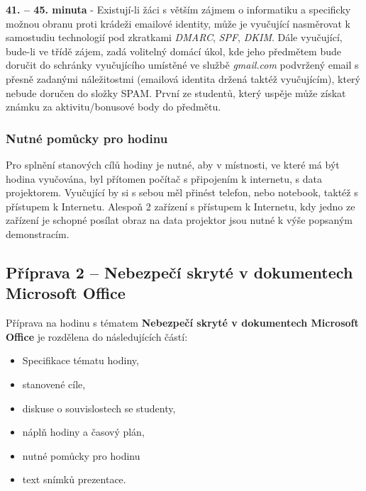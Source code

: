 \documentclass[a4paper, 12pt]{article}
\begin{document}
\textbf{41. -- 45. minuta} - Existují-li žáci s větším zájmem o informatiku a specificky možnou obranu proti krádeži emailové identity, může je vyučující nasměrovat k samostudiu technologií pod zkratkami \textit{DMARC}, \textit{SPF}, \textit{DKIM}. Dále vyučující, bude-li ve třídě zájem, zadá volitelný domácí úkol, kde jeho předmětem bude doručit do schránky vyučujícího umístěné ve službě \textit{gmail.com} podvržený email s přesně zadanými náležitostmi (emailová identita držená taktéž vyučujícím), který nebude doručen do složky SPAM. První ze studentů, který uspěje může získat známku za aktivitu/bonusové body do předmětu.

\subsubsection{Nutné pomůcky pro hodinu}
Pro splnění stanových cílů hodiny je nutné, aby v místnosti, ve které má být hodina vyučována, byl přítomen počítač s připojením k internetu, s data projektorem. Vyučující by si s sebou měl přinést telefon, nebo notebook, taktéž s přístupem k Internetu. Alespoň 2 zařízení s přístupem k Internetu, kdy jedno ze zařízení je schopné posílat obraz na data projektor jsou nutné k výše popsaným demonstracím.


\subsection{Příprava 2 -- Nebezpečí skryté v dokumentech Microsoft Office}
Příprava na hodinu s tématem \textbf{Nebezpečí skryté v dokumentech Microsoft Office} je rozdělena do následujících částí:
    \begin{itemize}
        \setlength{\itemsep}{-3pt}
        \item Specifikace tématu hodiny,
        \item stanovené cíle,
        \item diskuse o souvislostech se studenty,
        \item náplň hodiny a časový plán,
        \item nutné pomůcky pro hodinu
        \item text snímků prezentace.
    \end{itemize}
\end{document}
